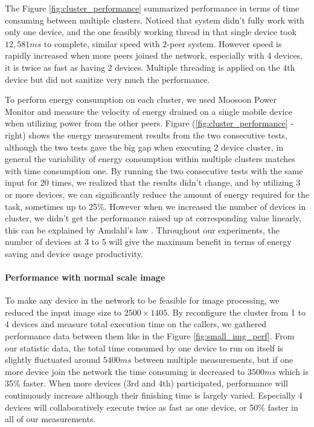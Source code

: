 \documentclass[conference]{IEEEtran}
\begin{document}
The Figure \ref{fig:cluster_performance} summarized performance in terms of time consuming between multiple clusters. Noticed that system didn't fully work with only one device, and the one feasibly working thread in that single device took $12,581ms$ to complete, similar speed with 2-peer system. However speed is rapidly increased when more peers joined the network, especially with 4 devices, it is twice as fast as having 2 devices. Multiple threading is applied on the 4th device but did not sanitize very much the performance. 

To perform energy consumption on each cluster, we used Moosoon Power Monitor and measure the velocity of energy drained on a single mobile device when utilizing power from the other peers. Figure (\ref{fig:cluster_performance} - right) shows the energy measurement results from the two consecutive tests, although the two tests gave the big gap when executing 2 device cluster, in general the variability of energy consumption within multiple clusters matches with time consumption one. By running the two consecutive tests with the same input for 20 times, we realized that the results didn't change, and by utilizing 3 or more devices, we can significantly reduce the amount of energy required for the task, sometimes up to 25\%. However when we increased the number of devices in cluster, we didn't get the performance raised up at corresponding value linearly, this can be explained by Amdahl's law \cite{amdahl}. Throughout our experiments, the number of devices at 3 to 5 will give the maximum benefit in terms of energy saving and device usage productivity.

\paragraph{Performance with normal scale image}
To make any device in the network to be feasible for image processing, we reduced the input image size to $2500 \times 1405$. By reconfigure the cluster from 1 to 4 devices and measure total execution time on the callers, we gathered performance data between them like in the Figure \ref{fig:small_img_perf}. From our statistic data, the total time consumed by one device to run on itself is slightly fluctuated around $5400ms$ between multiple measurements, but if one more device join the network the time consuming is decreased to $3500ms$ which is 35\% faster. When more devices (3rd and 4th) participated, performance will continuously increase although their finishing time is largely varied. Especially 4 devices will collaboratively execute twice as fast as one device, or 50\% faster in all of our measurements.
\end{document}

